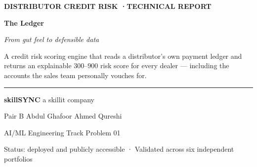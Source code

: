 \documentclass[11pt,a4paper]{article}
\begin{document}
\begin{titlepage}

\vspace*{4.6cm}
{\color{gold}\footnotesize\bfseries\sffamily
 DISTRIBUTOR CREDIT RISK \quad·\quad TECHNICAL REPORT}

\vspace{0.8cm}
{\color{white}\fontsize{40}{46}\selectfont\bfseries The Ledger}

\vspace{0.35cm}
{\color{ice}\fontsize{17}{22}\selectfont\itshape
 From gut feel to defensible data}

\vspace{1.1cm}
{\color{white}\normalsize
\begin{minipage}{0.82\textwidth}
\setlength{\parskip}{0pt}
A credit risk scoring engine that reads a distributor's own payment ledger and
returns an explainable 300--900 risk score for every dealer --- including the
accounts the sales team personally vouches for.
\end{minipage}}

\vspace{1.6cm}
{\color{gold}\rule{4.2cm}{1.1pt}}

\vspace{0.7cm}
{\color{white}\normalsize\bfseries skillSYNC} \;
{\color{ice}\normalsize a skillit company}

\vspace{0.35cm}
{\color{ice}\normalsize Pair B \;\textbar\; Abdul Ghafoor \;\textperiodcentered\; Ahmed Qureshi}

\vspace{0.2cm}
{\color{ice}\small AI/ML Engineering Track \;\textbar\; Problem 01}

\vfill
{\color{gold}\footnotesize
 Status: deployed and publicly accessible \quad·\quad
 Validated across six independent portfolios}
\vspace{1.5cm}
\end{titlepage}
\end{document}
